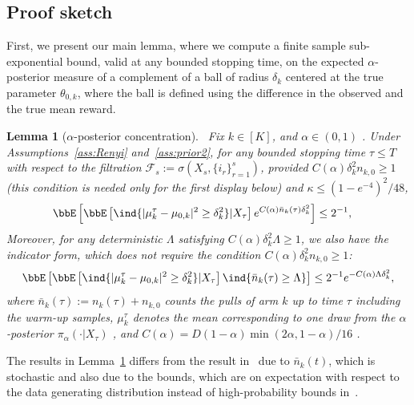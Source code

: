 \documentclass[11pt]{article}
\newtheorem{lemma}[theorem]{Lemma}
\begin{document}
\subsection{Proof sketch}
First, we present our main lemma, where we compute a finite sample sub-exponential bound, valid at any bounded stopping time, on the expected $\alpha$-posterior measure of a complement of a ball of radius $\delta_k$ centered at the true parameter $\theta_{0,k}$, where the ball is defined using the difference in the observed and the true mean reward.   
        \begin{lemma}[$\alpha$-posterior concentration]~\label{lem:Post}
            Fix {$k\in [K]$,} and $\alpha\in(0,1)$ . Under  Assumptions~\ref{ass:Renyi} and~\ref{ass:prior2}, for  any bounded stopping time $\tau \leq T$ with respect to the filtration $\mathcal{F}_s := \sigma\left(X_s, \{i_r\}_{r=1}^s\right)$, provided $C(\alpha)\delta_k^2 n_{k,0} \geq 1$ (this condition is needed only for the first display below)  and $\kappa \leq (1-e^{-4})^2/48$, 
            \begin{align}
                \bbE& \left[ \bbE\left[ \ind\{|\mu_k^{\tau} -\mu_{0,k} |^2 \geq \delta_k^2 \} | X_{\tau} \right] e^{C(\alpha) \bar n_k(\tau) \delta_k^2} \right] 
                \leq 2^{-1},
                \label{eq:postcon}
            \end{align}
            Moreover, for any deterministic $\Lambda$ satisfying $C(\alpha)\delta_k^2 \Lambda \geq 1$, we also have the indicator form, which does \emph{not} require the condition $C(\alpha)\delta_k^2 n_{k,0} \geq 1$:
            \begin{align}
                \bbE \left[ \bbE\left[ \ind\{|\mu_k^{\tau} -\mu_{0,k} |^2 \geq \delta_k^2 \} | X_{\tau} \right] \ind\{\bar n_k(\tau) \geq \Lambda\} \right] 
                \leq 2^{-1} e^{ - C(\alpha) \Lambda \delta_k^2 },
                \label{eq:postconL}
            \end{align}
            where $\bar n_k(\tau) := n_k(\tau)+n_{k,0}$ counts the pulls of arm $k$ up to time $\tau$ including the warm-up samples, $\mu_k^{\tau}$ denotes the mean corresponding to one draw from the $\alpha$-posterior $\pi_{\alpha}(\cdot|X_{\tau})$ %
            , and $C(\alpha) = D (1-\alpha) \min \left(2\alpha,1-\alpha  \right)/16$ .
        \end{lemma}
         The results in Lemma~\ref{lem:Post} differs from the result in~\citep[Theorem 3.1 and Corollary 3.2]{bhattacharya2019bayesian} due to $\bar n_k(t)$, which is stochastic and also due to the bounds, which are on expectation with respect to the data generating distribution instead of high-probability bounds in~\citep{bhattacharya2019bayesian}.   
         
\end{document}

